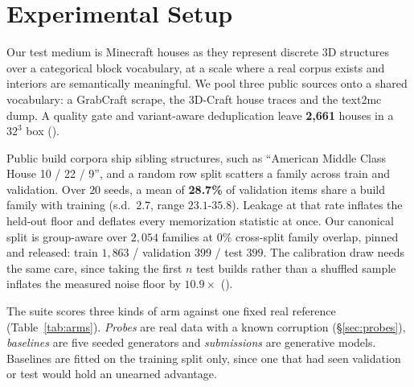 \section{Experimental Setup}
\label{sec:setting}

Our test medium is Minecraft houses as they represent discrete {3D} structures over a categorical block
vocabulary, at a scale where a real corpus exists and interiors are semantically
meaningful. We pool three public sources onto a shared vocabulary: a GrabCraft scrape,
the 3D-Craft house traces \citep{chen2019voxelcnn,gray2019craftassist} and the text2mc
dump. A quality gate and variant-aware deduplication leave \textbf{2{,}661} houses in a
$32^3$ box ().

Public build corpora ship sibling structures, such as ``American Middle Class House 10 /
22 / 9'', and a random row split scatters a family across train and validation. Over $20$
seeds, a mean of \textbf{28.7\%} of validation items share a build family with training
(s.d.\ $2.7$, range $23.1$-$35.8$). Leakage at that rate inflates the held-out floor and
deflates every memorization statistic at once. Our canonical split is group-aware over
$2{,}054$ families at $0\%$ cross-split family overlap, pinned and released: train
$1{,}863$ / validation $399$ / test $399$.  The calibration draw needs the same care, since
taking the first $n$ test builds rather than a shuffled sample inflates the measured noise
floor by $\mathbf{10.9\times}$ ().

The suite scores three kinds of arm against one fixed real reference
(Table~\ref{tab:arms}). \emph{Probes} are real data with a known corruption
(\S\ref{sec:probes}), \emph{baselines} are five seeded generators and
\emph{submissions} are generative models. Baselines are fitted on the training split
only, since one that had seen validation or test would hold an unearned advantage.

